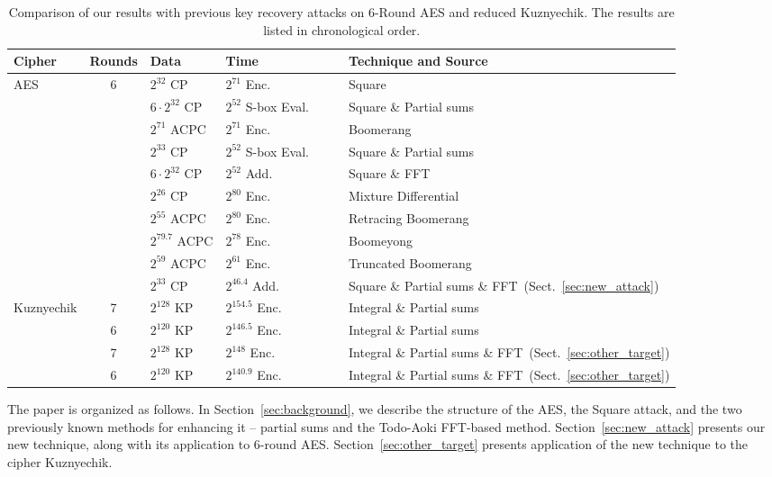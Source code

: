 \begin{table}[t]
\begin{center}
\caption{Comparison of our results with previous key recovery attacks on 6-Round AES and reduced Kuznyechik. The results are listed in chronological order.}  \begin{tabular}{lcllll}
\hline
Cipher & Rounds & Data          & Time           & ~~ & \multicolumn{1}{l}{Technique and Source}\\
\hline
\hline
AES & 6 & $2^{32}$ CP & $2^{71}$ Enc. & & Square~\cite{FSE:DaemenKR97} \\
    &   & $6 \cdot 2^{32}$ CP & $2^{52}$ S-box Eval.  & & Square \& Partial sums~\cite{FSE:FKLSSWW00}\\
    & & $2^{71}$ ACPC & $2^{71}$ Enc. & & Boomerang~\cite{AES:Biryukov04}\\
    & & $2^{33}$ CP & $2^{52}$ S-box Eval. & & Square \& Partial sums~\cite{Tunstall12}\\
    & & $6 \cdot 2^{32}$ CP & $2^{52}$ Add. & & Square \& FFT~\cite{CANS:TodAok14}\\
    & & $2^{26}$ CP & $2^{80}$ Enc. & & Mixture Differential~\cite{JOC:Bar-OnDKRS20} \\
    & & $2^{55}$ ACPC & $2^{80}$ Enc. & & Retracing Boomerang~\cite{EC:DunkelmanKRS20} \\
    & & $2^{79.7}$ ACPC & $2^{78}$ Enc. & & Boomeyong~\cite{TOSC:RahmanS021} \\
    & & $2^{59}$ ACPC & $2^{61}$ Enc.  & & Truncated Boomerang~\cite{EPRINT:BarLeu22}\\
\hline
    & & $2^{33}$ CP & $2^{46.4}$ Add. & & Square \& Partial sums \& FFT~(Sect.~\ref{sec:new_attack})\\
\hline\hline
Kuznyechik & 7 & $2^{128}$ KP & $2^{154.5}$ Enc. & & Integral \& Partial sums~\cite{TOSC:BirKhoPer16}\\
& 6 & $2^{120}$ KP & $2^{146.5}$ Enc. & & Integral \& Partial sums~\cite{TOSC:BirKhoPer16}\\
\hline
     & 7 & $2^{128}$ KP & $2^{148}$ Enc. & & Integral \& Partial sums \& FFT~(Sect.~\ref{sec:other_target})\\
     & 6 & $2^{120}$ KP & $2^{140.9}$ Enc. & & Integral \& Partial sums \& FFT~(Sect.~\ref{sec:other_target})\\
\hline\hline
\end{tabular}
\label{Tab:Results}
\end{center}
\end{table}
The paper is organized as follows. In Section~\ref{sec:background}, we describe the structure of the AES, the Square attack, and the two previously known methods for enhancing it -- partial sums and the Todo-Aoki FFT-based method. Section~\ref{sec:new_attack} presents our new technique, along with its application to 6-round AES.
Section~\ref{sec:other_target} presents application of the new technique to the cipher Kuznyechik. 

